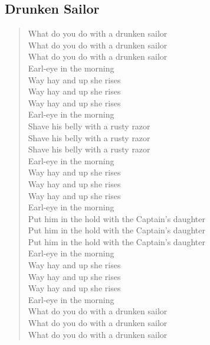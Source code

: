 \documentclass[11pt]{article}
\begin{document}
\subsection{Drunken Sailor}
\label{sec:org78e6c20}
\begin{verse}
\vspace*{1em}
What do you do with a drunken sailor\\
What do you do with a drunken sailor\\
What do you do with a drunken sailor\\
Earl-eye in the morning\\
\vspace*{1em}
Way hay and up she rises\\
Way hay and up she rises\\
Way hay and up she rises\\
Earl-eye in the morning\\
\vspace*{1em}
Shave his belly with a rusty razor\\
Shave his belly with a rusty razor\\
Shave his belly with a rusty razor\\
Earl-eye in the morning\\
\vspace*{1em}
Way hay and up she rises\\
Way hay and up she rises\\
Way hay and up she rises\\
Earl-eye in the morning\\
\vspace*{1em}
Put him in the hold with the Captain's daughter\\
Put him in the hold with the Captain's daughter\\
Put him in the hold with the Captain's daughter\\
Earl-eye in the morning\\
\vspace*{1em}
Way hay and up she rises\\
Way hay and up she rises\\
Way hay and up she rises\\
Earl-eye in the morning\\
\vspace*{1em}
What do you do with a drunken sailor\\
What do you do with a drunken sailor\\
What do you do with a drunken sailor\\

\end{verse}
\end{document}

